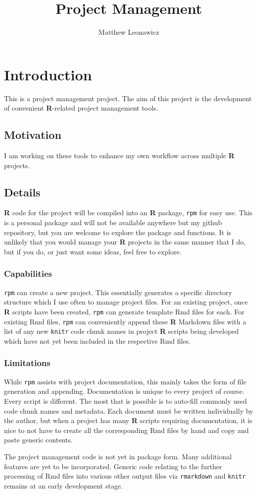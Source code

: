 \documentclass{article}\usepackage[]{graphicx}\usepackage[]{color}
\begin{document}
\title{Project Management}
\author{Matthew Leonawicz}
\maketitle



\section{Introduction}
This is a project management project.
The aim of this project is the development of convenient \textbf{R}-related project management tools.

\subsection{Motivation}
I am working on these tools to enhance my own workflow across multiple \textbf{R} projects.

\subsection{Details}
\textbf{R} code for the project will be compiled into an \textbf{R} package, \texttt{rpm} for easy use.
This is a personal package and will not be available anywhere but my github repository,
but you are welcome to explore the package and functions.
It is unlikely that you would manage your \textbf{R} projects in the same manner that I do,
but if you do, or just want some ideas, feel free to explore.

\subsubsection{Capabilities}
\texttt{rpm} can create a new project. This essentially generates a specific directory structure which I use often to manage project files.
For an existing project, once \textbf{R} scripts have been created, \texttt{rpm} can generate template Rmd files for each.
For existing Rmd files, \texttt{rpm} can conveniently append these \textbf{R} Markdown files with a list of any new \texttt{knitr} code chunk names
in project \textbf{R} scripts being developed which have not yet been included in the respective Rmd files.

\subsubsection{Limitations}
While \texttt{rpm} assists with project documentation, this mainly takes the form of file generation and appending.
Documentation is unique to every project of course. Every script is different.
The most that is possible is to auto-fill commonly used code chunk names and metadata.
Each document must be written individually by the author, but when a project has many \textbf{R} scripts requiring documentation,
it is nice to not have to create all the corresponding Rmd files by hand and copy and paste generic contents.

The project management code is not yet in package form.
Many additional features are yet to be incorporated.
Generic code relating to the further processing of Rmd files into various other output files via \texttt{rmarkdown} and \texttt{knitr} remains at an early development stage.
\end{document}
